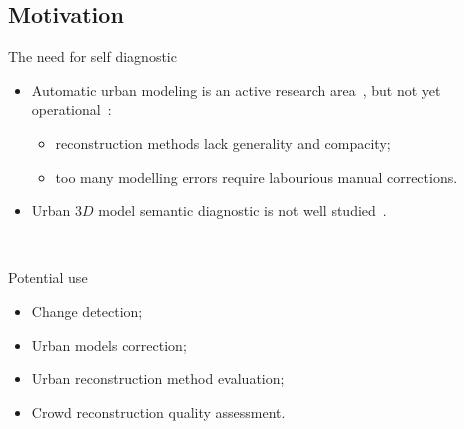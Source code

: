 \documentclass{beamer}
\begin{document}
        \subsection{Motivation}
            \begin{frame}{The need for self diagnostic}
                \begin{itemize}[label=$\blacktriangleright$, font=\color{IGNGreen}]
                    \item<1-> Automatic urban modeling is an active research area~\citep{Musialski2012}, but not \textcolor{IGNRed}{yet operational}~\citep{rottensteiner2014results}:
                    \begin{itemize}[label=--]
                        \item reconstruction methods lack generality and compacity;
                        \item too many modelling errors require labourious manual corrections.
                    \end{itemize}
                    \item<2-> Urban $3D$ model semantic diagnostic is not well studied~\citep{nguatem2017modeling}.
                \end{itemize}
                ~\\
            \end{frame}

            \begin{frame}{Potential use}
                \begin{itemize}[label=$\blacktriangleright$, font=\color{IGNGreen}, itemsep=2em]
                    \item<1-> Change detection;
                    \item<2-> Urban models correction;
                    \item<3-> Urban reconstruction method evaluation;
                    \item<4-> Crowd reconstruction quality assessment.
                \end{itemize}
            \end{frame}
\end{document}
